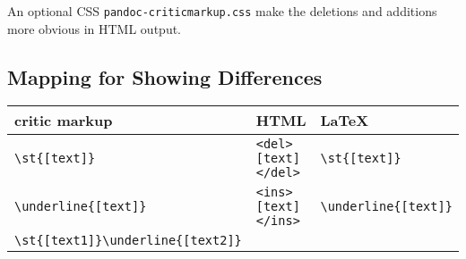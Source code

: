 \documentclass[]{article}
\begin{document}
An optional CSS \texttt{pandoc-criticmarkup.css} make the deletions and
additions more obvious in HTML output.

\subsection{Mapping for Showing
Differences}\label{mapping-for-showing-differences}

\begin{longtable}[]{@{}lll@{}}
\toprule
\begin{minipage}[b]{0.28\columnwidth}\raggedright\strut
critic markup
\strut\end{minipage} &
\begin{minipage}[b]{0.33\columnwidth}\raggedright\strut
HTML
\strut\end{minipage} &
\begin{minipage}[b]{0.31\columnwidth}\raggedright\strut
LaTeX
\strut\end{minipage}\tabularnewline
\midrule
\endhead
\begin{minipage}[t]{0.28\columnwidth}\raggedright\strut
\texttt{\textbackslash{}st\{{[}text{]}\}}
\strut\end{minipage} &
\begin{minipage}[t]{0.33\columnwidth}\raggedright\strut
\texttt{\textless{}del\textgreater{}{[}text{]}\textless{}/del\textgreater{}}
\strut\end{minipage} &
\begin{minipage}[t]{0.31\columnwidth}\raggedright\strut
\texttt{\textbackslash{}st\{{[}text{]}\}}
\strut\end{minipage}\tabularnewline
\begin{minipage}[t]{0.28\columnwidth}\raggedright\strut
\texttt{\textbackslash{}underline\{{[}text{]}\}}
\strut\end{minipage} &
\begin{minipage}[t]{0.33\columnwidth}\raggedright\strut
\texttt{\textless{}ins\textgreater{}{[}text{]}\textless{}/ins\textgreater{}}
\strut\end{minipage} &
\begin{minipage}[t]{0.31\columnwidth}\raggedright\strut
\texttt{\textbackslash{}underline\{{[}text{]}\}}
\strut\end{minipage}\tabularnewline
\begin{minipage}[t]{0.28\columnwidth}\raggedright\strut
\texttt{\textbackslash{}st\{{[}text1{]}\}\textbackslash{}underline\{{[}text2{]}\}}
\strut\end{minipage} &

\end{longtable}
\end{document}
